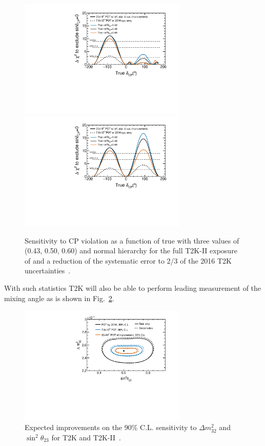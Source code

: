 \begin{figure} [htbp!]
\begin{center}
\includegraphics[width=8cm]{figures/t2kpre_dcp_point1_100k4check_100ksensi_wreactorthrow_optv2s13off_truedcp_unknownMH_fakesyst_lohidcpExclusive.pdf}
\includegraphics[width=8cm]{figures/t2kpre_dcp_point1_100k4check_100ksensi_wreactorthrow_optv2s13off_truedcp_fakesyst_lohidcpExclusive.pdf}
\caption{\label{fig:t2k2sensi} Sensitivity to CP violation as a function of true
\dcp with three values of \stt (0.43, 0.50, 0.60) and normal hierarchy for the full T2K-II exposure of \twopott and a reduction of the systematic error to 2/3 of the 2016 T2K uncertainties~\cite{Abe:2016tez}.}
\end{center}
\end{figure}

With such statistics T2K will also be able to perform leading measurement of the \stt mixing angle as is shown in Fig.~\ref{fig:t2k2th23}.

\begin{figure} [htbp!]
\begin{center}
\includegraphics[width=8cm]{figures/t2kpre_t23dm32_point1_wreactorthrow.pdf}
\caption{\label{fig:t2k2th23} Expected improvements on the 90\% C.L. sensitivity to $\Delta m^2_{32}$ and $\sin^2\theta_{23}$
for T2K and T2K-II~\cite{Abe:2016tez}.}
\end{center}
\end{figure}

